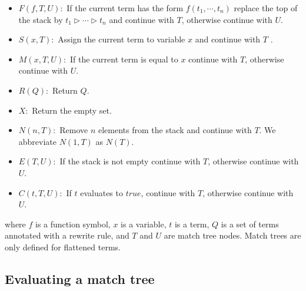 \documentclass{article}
\begin{document}
\begin{itemize}
\item $F(f,T,U):$ If the current term has the form $f(t_{1},\cdots ,t_{n})$
replace the top of the stack by $t_{1}\rhd \cdots \rhd t_{n}$ and continue
with $T$, otherwise continue with $U$.

\item $S(x,T):$ Assign the current term to variable $x$ and continue with $T$%
.

\item $M(x,T,U):$ If the current term is equal to $x$ continue with $T$,
otherwise continue with $U$.

\item $R(Q):$ Return $Q$.

\item $X:$ Return the empty set.

\item $N(n,T):$ Remove $n$ elements from the stack and continue with $T$. We
abbreviate $N(1,T)$ as $N(T)$.

\item $E(T,U):$ If the stack is not empty continue with $T$, otherwise
continue with $U$.

\item $C(t,T,U):$ If $t$ evaluates to $true$, continue with $T$, otherwise
continue with $U$.
\end{itemize}

where $f$ is a function symbol, $x$ is a variable, $t$ is a term, $Q$ is a
set of terms annotated with a rewrite rule, and $T$ and $U$ are match tree
nodes. Match trees are only defined for flattened terms.

\subsection{Evaluating a match tree}
\end{document}

